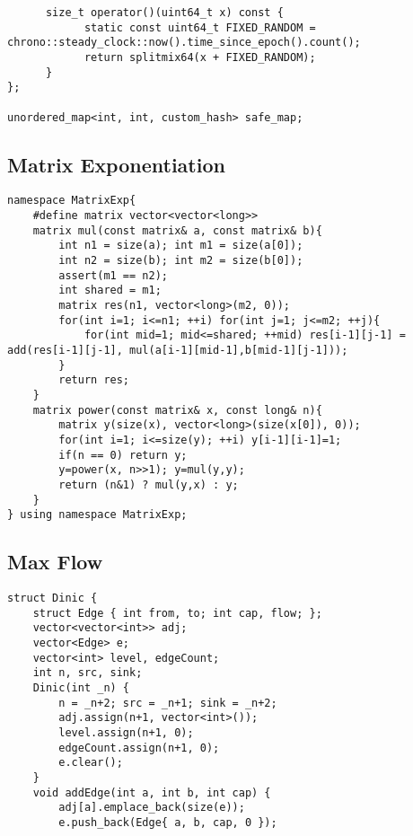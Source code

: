 \documentclass[12pt,a4paper,onesided]{article}
\begin{document}
\begin{multicols}{3}
\begin{lstlisting}
      size_t operator()(uint64_t x) const {
            static const uint64_t FIXED_RANDOM = chrono::steady_clock::now().time_since_epoch().count();
            return splitmix64(x + FIXED_RANDOM);
      }
};

unordered_map<int, int, custom_hash> safe_map;
\end{lstlisting}


\subsection{Matrix Exponentiation}
\begin{lstlisting}
namespace MatrixExp{
	#define matrix vector<vector<long>>
	matrix mul(const matrix& a, const matrix& b){
		int n1 = size(a); int m1 = size(a[0]);
		int n2 = size(b); int m2 = size(b[0]);
		assert(m1 == n2);
		int shared = m1;
		matrix res(n1, vector<long>(m2, 0));
		for(int i=1; i<=n1; ++i) for(int j=1; j<=m2; ++j){
			for(int mid=1; mid<=shared; ++mid) res[i-1][j-1] = add(res[i-1][j-1], mul(a[i-1][mid-1],b[mid-1][j-1]));
		}
		return res;
	}
	matrix power(const matrix& x, const long& n){
		matrix y(size(x), vector<long>(size(x[0]), 0));
		for(int i=1; i<=size(y); ++i) y[i-1][i-1]=1;
		if(n == 0) return y;
		y=power(x, n>>1); y=mul(y,y);
		return (n&1) ? mul(y,x) : y;
	}
} using namespace MatrixExp;
\end{lstlisting}


\subsection{Max Flow}
\begin{lstlisting}
struct Dinic {
	struct Edge { int from, to; int cap, flow; };
	vector<vector<int>> adj;
	vector<Edge> e;
	vector<int> level, edgeCount;
	int n, src, sink;
	Dinic(int _n) {
		n = _n+2; src = _n+1; sink = _n+2;
		adj.assign(n+1, vector<int>());
		level.assign(n+1, 0);
		edgeCount.assign(n+1, 0);
		e.clear();
	}
	void addEdge(int a, int b, int cap) {
		adj[a].emplace_back(size(e));
		e.push_back(Edge{ a, b, cap, 0 });
		

\end{lstlisting}
\end{multicols}
\end{document}
